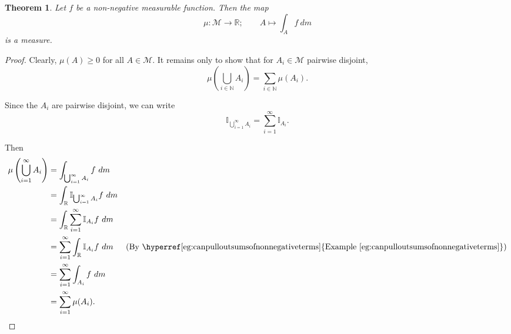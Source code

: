\documentclass[a4paper,12pt]{scrreprt}
\newcommand{\R}{\mathbb{R}}
\newcommand{\N}{\mathbb{N}}
\theoremstyle{definition}
\theoremstyle{plain}
\newtheorem{theorem}{Theorem}[section]
\theoremstyle{remark}
\begin{document}

\begin{theorem}
  \label{thm:integrationagainstnonnegativefunctioismeasure}
  Let $f$ be a non-negative measurable function. Then the map
  \begin{equation*}
    \mu\colon \mathcal{M} \to \R;\qquad A \mapsto \int_{A} f\ dm
  \end{equation*}
  is a measure.
\end{theorem}
\begin{proof}
  Clearly, $\mu(A) \geq 0$ for all $A \in \mathcal{M}$. It remains only to show that for $A_{i} \in \mathcal{M}$ pairwise disjoint,
  \begin{equation*}
    \mu\left( \bigcup_{i \in \N} A_{i} \right) = \sum_{i \in \N} \mu(A_{i}).
  \end{equation*}

  Since the $A_{i}$ are pairwise disjoint, we can write
  \begin{equation*}
    \mathbb{I}_{\bigcup_{i = 1}^{\infty} A_{i}} = \sum_{i = 1}^{\infty} \mathbb{I}_{A_{i}}.
  \end{equation*}

  Then
  \begin{align*}
    \mu\left( \bigcup_{i = 1}^{\infty} A_{i} \right) &=  \int_{\bigcup_{i = 1}^{\infty} A_{i}} f\ dm \\
    &= \int_{\R} \mathbb{I}_{\bigcup_{i = 1}^{\infty} A_{i}} f\ dm \\
    &= \int_{\R} \sum_{i = 1}^{\infty} \mathbb{I}_{A_{i}} f\ dm \\
    &= \sum_{i = 1}^{\infty} \int_{\R} \mathbb{I}_{A_{i}}f\ dm & (\text{By \hyperref[eg:canpulloutsumsofnonnegativeterms]{Example~\ref*{eg:canpulloutsumsofnonnegativeterms}}}) \\
    &= \sum_{i = 1}^{\infty} \int_{A_{i}} f\ dm \\
    &= \sum_{i = 1}^{\infty} \mu(A_{i}).
  \end{align*}
\end{proof}
\end{document}
